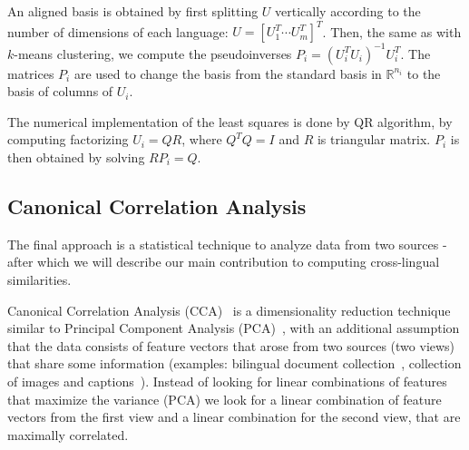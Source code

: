 \documentclass[twoside,11pt]{article}
\newcommand{\RR}{\mathbb{R}}
\begin{document}
An aligned basis is obtained by first splitting $U$ vertically according to the number of dimensions of each language: $U = [U_1^T \cdots U_m^T]^T$. Then, the same as with $k$-means clustering, we compute the pseudoinverses $P_i = (U_i^T U_i)^{-1} U_i^T$. The matrices $P_i$ are used to change the basis from the standard basis in $\RR^{n_i}$ to the basis of columns of $U_i$.

The numerical implementation of the least squares is done by QR algorithm, by computing factorizing $U_i = Q R$, where $Q^TQ = I$ and $R$ is triangular matrix. $P_i$ is then obtained by solving $R P_i = Q$.


\subsection{Canonical Correlation Analysis}\label{sec:CCA}
 The final approach is a statistical technique to analyze data from two sources - after which we will describe our main contribution to computing cross-lingual similarities.

 Canonical Correlation Analysis (CCA)~\cite{Hotelling} is a dimensionality reduction technique similar to Principal Component Analysis (PCA)~\cite{Pearson1901On}, with an additional assumption that the data consists of feature vectors that arose from two sources (two views) that share some information (examples: bilingual document collection~, collection of images and captions~). Instead of looking for linear combinations of features that maximize the variance (PCA) we look for a linear combination of feature vectors from the first view and a linear combination for the second view, that are maximally correlated.
\end{document}

